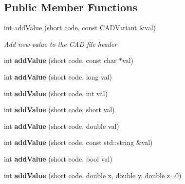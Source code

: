 \subsection*{Public Member Functions}
\begin{DoxyCompactItemize}
\item 
int \hyperlink{class_c_a_d_header_a473f456d99e96825bb5207a5c4abeaa4}{add\+Value} (short code, const \hyperlink{class_c_a_d_variant}{C\+A\+D\+Variant} \&val)
\begin{DoxyCompactList}\small\item\em Add new value to the C\+AD file header. \end{DoxyCompactList}\item 
int {\bfseries add\+Value} (short code, const char $\ast$val)\hypertarget{class_c_a_d_header_a038229e6e88cabe0cddede5efa7b0323}{}\label{class_c_a_d_header_a038229e6e88cabe0cddede5efa7b0323}

\item 
int {\bfseries add\+Value} (short code, long val)\hypertarget{class_c_a_d_header_ad640a6fc267d3fd0233ec5f75e786e4f}{}\label{class_c_a_d_header_ad640a6fc267d3fd0233ec5f75e786e4f}

\item 
int {\bfseries add\+Value} (short code, int val)\hypertarget{class_c_a_d_header_aef299b22e5974227674f0fa2e827dfc9}{}\label{class_c_a_d_header_aef299b22e5974227674f0fa2e827dfc9}

\item 
int {\bfseries add\+Value} (short code, short val)\hypertarget{class_c_a_d_header_a3189f204e968e731c20e4ca7a684e154}{}\label{class_c_a_d_header_a3189f204e968e731c20e4ca7a684e154}

\item 
int {\bfseries add\+Value} (short code, double val)\hypertarget{class_c_a_d_header_ac78e2f7126160dde71ab2b8d0abe4c37}{}\label{class_c_a_d_header_ac78e2f7126160dde71ab2b8d0abe4c37}

\item 
int {\bfseries add\+Value} (short code, const std\+::string \&val)\hypertarget{class_c_a_d_header_aa34a737e643a1b727f89ff86fdf4ffa1}{}\label{class_c_a_d_header_aa34a737e643a1b727f89ff86fdf4ffa1}

\item 
int {\bfseries add\+Value} (short code, bool val)\hypertarget{class_c_a_d_header_a9c406b04d9e03ccaa6ed0a22bf1c1151}{}\label{class_c_a_d_header_a9c406b04d9e03ccaa6ed0a22bf1c1151}

\item 
int {\bfseries add\+Value} (short code, double x, double y, double z=0)\hypertarget{class_c_a_d_header_a015793c4620fd3323a9021b1f2c2c618}{}\label{class_c_a_d_header_a015793c4620fd3323a9021b1f2c2c618}


\end{DoxyCompactItemize}
